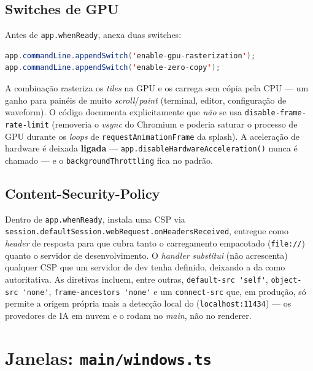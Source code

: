 \subsection{Switches de GPU}
\label{sec:05-gpu}

Antes de \lstinline|app.whenReady|,  anexa duas switches:

\begin{lstlisting}[language=Java]
app.commandLine.appendSwitch('enable-gpu-rasterization');
app.commandLine.appendSwitch('enable-zero-copy');
\end{lstlisting}

A combinação rasteriza os \emph{tiles} na GPU e os carrega sem cópia pela CPU ---
um ganho para painéis de muito \emph{scroll}/\emph{paint} (terminal, editor,
configuração de waveform). O código documenta explicitamente que \emph{não} se
usa \lstinline|disable-frame-rate-limit| (removeria o \emph{vsync} do Chromium e
poderia saturar o processo de GPU durante os \emph{loops} de
\lstinline|requestAnimationFrame| da splash). A aceleração de hardware é deixada
\textbf{ligada} --- \lstinline|app.disableHardwareAcceleration()| nunca é chamado
--- e o \lstinline|backgroundThrottling| fica no padrão.

\subsection{Content-Security-Policy}
\label{sec:05-csp}

Dentro de \lstinline|app.whenReady|,  instala uma CSP via
\lstinline|session.defaultSession.webRequest.onHeadersReceived|, entregue como
\emph{header} de resposta para que cubra tanto o carregamento empacotado
(\lstinline|file://|) quanto o servidor de desenvolvimento. O \emph{handler}
\emph{substitui} (não acrescenta) qualquer CSP que um servidor de dev tenha
definido, deixando a da  como autoritativa. As diretivas incluem,
entre outras, \lstinline|default-src 'self'|, \lstinline|object-src 'none'|,
\lstinline|frame-ancestors 'none'| e um \lstinline|connect-src| que, em produção,
só permite a origem própria mais a detecção local do 
(\lstinline|localhost:11434|) --- os provedores de IA em nuvem e o 
rodam no \emph{main}, não no renderer.

\section{Janelas: \texttt{main/windows.ts}}
\label{sec:05-janelas}

